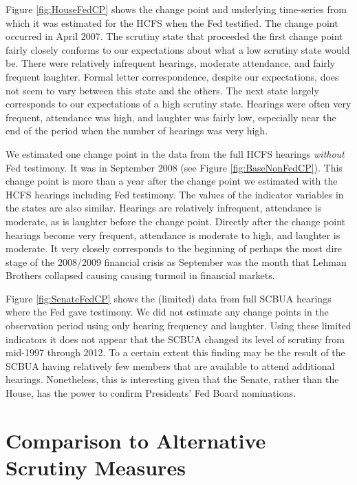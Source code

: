 \documentclass[a4paper]{article}\usepackage[]{graphicx}\usepackage[]{color}
\begin{document}
Figure \ref{fig:HouseFedCP} shows the change point and underlying time-series from which it was estimated for the HCFS when the Fed testified. The change point occurred in April 2007. The scrutiny state that proceeded the first change point fairly closely conforms to our expectations about what a low scrutiny state would be. There were relatively infrequent hearings, moderate attendance, and fairly frequent laughter. Formal letter correspondence, despite our expectations, does not seem to vary between this state and the others. The next state largely corresponds to our expectations of a high scrutiny state. Hearings were often very frequent, attendance was high, and laughter was fairly low, especially near the end of the period when the number of hearings was very high.

We estimated one change point in the data from the full HCFS hearings \emph{without} Fed testimony. It was in September 2008 (see Figure \ref{fig:BaseNonFedCP}). This change point is more than a year after the change point we estimated with the HCFS hearings including Fed testimony. The values of the indicator variables in the states are also similar. Hearings are relatively infrequent, attendance is moderate, as is laughter before the change point. Directly after the change point hearings become very frequent, attendance is moderate to high, and laughter is moderate. It very closely corresponds to the beginning of perhaps the most dire stage of the 2008/2009 financial crisis as September was the month that Lehman Brothers collapsed causing causing turmoil in financial markets.

Figure \ref{fig:SenateFedCP} shows the (limited) data from full SCBUA hearings where the Fed gave testimony. We did not estimate any change points in the observation period using only hearing frequency and laughter. Using these limited indicators it does not appear that the SCBUA changed its level of scrutiny from mid-1997 through 2012. To a certain extent this finding may be the result of the SCBUA having relatively few members that are available to attend additional hearings. Nonetheless, this is interesting given that the Senate, rather than the House, has the power to confirm Presidents' Fed Board nominations.

\section{Comparison to Alternative Scrutiny Measures}
\end{document}

